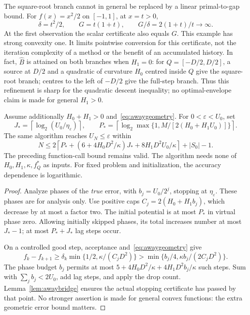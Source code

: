 The square-root branch cannot in general be replaced by a linear
primal-to-gap bound. For $f(x)=x^2/2$ on $[-1,1]$, at $x=t>0$,
\[
 \delta=t^2/2,\qquad G=t(1+t),\qquad G/\delta=2(1+t)/t\longrightarrow\infty.
\]
At the first observation the scalar certificate also equals $G$.
This example has strong convexity one. It limits pointwise conversion
for this certificate, not the iteration complexity of a method or
the benefit of an accumulated history. In fact, $\widehat B$ is attained
on both branches when $H_1=0$: for $Q=[-D/2,D/2]$, a source at $D/2$
and a quadratic of curvature $H_0$ centred inside $Q$ give the
square-root branch; centres to the left of $-D/2$ give the full-step
branch. Thus this refinement is sharp for the quadratic descent
inequality; no optimal-envelope claim is made for general $H_1>0$.

\begin{theorem}\label{thm:awaystrong}
Assume additionally $H_0+H_1>0$ and~\eqref{eq:awaygeometry}. For
$0<\varepsilon<U_0$, set
\[
 J_*=\left\lceil\log_2(U_0/\eta_\varepsilon)\right\rceil,\qquad
 P_*=\left\lceil\log_2\max\{1,M/[2(H_0+H_1U_0)]\}\right\rceil.
\]
The same algorithm reaches $U_N\le\varepsilon$ within
\[
 N\le2\left\lceil P_*+
       (6+4H_0D^2/\kappa)J_*+8H_1D^2U_0/\kappa\right\rceil+|S_0|-1.
\]
The preceding function-call bound remains valid. The algorithm needs
none of $H_0,H_1,\kappa,f_Q^*$ as inputs. For fixed problem and
initialization, the accuracy dependence is logarithmic.
\end{theorem}
\begin{proof}
Analyze phases of the \emph{true} error, with $b_j=U_0/2^j$, stopping
at $\eta_\varepsilon$. These phases are for analysis only. Use positive
caps $C_j=2(H_0+H_1b_j)$, which decrease by at most a factor two.
The initial potential is at most $P_*$ in virtual phase zero. Allowing
initially skipped phases, its total increases number at most $J_*-1$;
at most $P_*+J_*$ lag steps occur.

On a controlled good step, acceptance and~\eqref{eq:awaygeometry} give
\[
 f_k-f_{k+1}\ge\delta_k\min\{1/2,\kappa/(C_jD^2)\}
 >\min\{b_j/4,\kappa b_j/(2C_jD^2)\}.
\]
The phase budget $b_j$ permits at most
$5+4H_0D^2/\kappa+4H_1D^2b_j/\kappa$ such steps.
Sum with $\sum_jb_j<2U_0$, add lag steps, and apply the drop count.
Lemma~\ref{lem:awaybridge} ensures the actual stopping certificate has
passed by that point. No stronger assertion is made for general convex
functions: the extra geometric error bound matters.
\end{proof}
